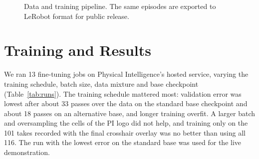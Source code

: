 \documentclass[10pt,letterpaper]{article}
\begin{document}
\begin{figure}[!ht]
\centering
{}
\caption{Data and training pipeline. The same episodes are exported to LeRobot format for public release.}
\label{fig:pipeline}
\end{figure}

\section{Training and Results}

We ran 13 fine-tuning jobs on Physical Intelligence's hosted service, varying the training schedule, batch size, data mixture and base checkpoint (Table~\ref{tab:runs}). The training schedule mattered most: validation error was lowest after about 33 passes over the data on the standard base checkpoint and about 18 passes on an alternative base, and longer training overfit. A larger batch and oversampling the cells of the PI logo did not help, and training only on the 101 takes recorded with the final crosshair overlay was no better than using all 116. The run with the lowest error on the standard base was used for the live demonstration.
\end{document}
